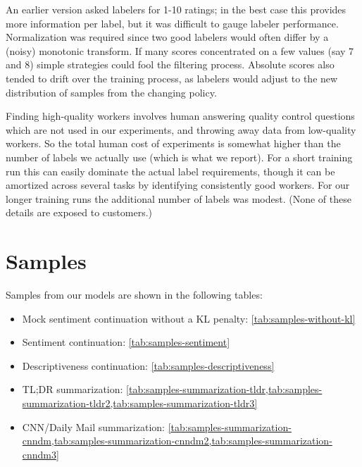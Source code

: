 \documentclass{article}
\begin{document}
An earlier version asked labelers for 1-10 ratings; in the best case this provides more information per label, but it was difficult to gauge labeler performance.  Normalization was required since two good labelers would often differ by a (noisy) monotonic transform.  If many scores concentrated on a few values (say 7 and 8) simple strategies could fool the filtering process.  Absolute scores also tended to drift over the training process, as labelers would adjust to the new distribution of samples from the changing policy.

Finding high-quality workers involves human answering quality control questions
which are not used in our experiments, and throwing away data from low-quality workers.
So the total human cost of experiments is somewhat higher than the number of labels
we actually use (which is what we report).
For a short training run this can easily dominate the actual label requirements,
though it can be amortized across several tasks by identifying consistently good workers.
For our longer training runs the additional number of labels was modest.
(None of these details are exposed to customers.)

\section{Samples}

Samples from our models are shown in the following tables:
\begin{itemize}
\item Mock sentiment continuation without a KL penalty: \cref{tab:samples-without-kl} 
\item Sentiment continuation: \cref{tab:samples-sentiment}
\item Descriptiveness continuation: \cref{tab:samples-descriptiveness}
\item TL;DR summarization: \cref{tab:samples-summarization-tldr,tab:samples-summarization-tldr2,tab:samples-summarization-tldr3}
\item CNN/Daily Mail summarization: \cref{tab:samples-summarization-cnndm,tab:samples-summarization-cnndm2,tab:samples-summarization-cnndm3} 
\end{itemize}

\end{document}
